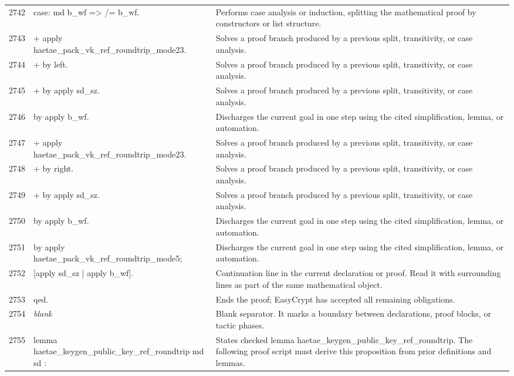\documentclass[10pt]{article}
\begin{document}
\begin{longtable}{r L{0.53\textwidth} L{0.37\textwidth}}
2742 & {\ttfamily\scriptsize case: md b\_wf => /= b\_wf.} & Performs case analysis or induction, splitting the mathematical proof by constructors or list structure. \\
2743 & {\ttfamily\scriptsize + apply haetae\_pack\_vk\_ref\_roundtrip\_mode23.} & Solves a proof branch produced by a previous split, transitivity, or case analysis. \\
2744 & {\ttfamily\scriptsize   + by left.} & Solves a proof branch produced by a previous split, transitivity, or case analysis. \\
2745 & {\ttfamily\scriptsize   + by apply sd\_sz.} & Solves a proof branch produced by a previous split, transitivity, or case analysis. \\
2746 & {\ttfamily\scriptsize   by apply b\_wf.} & Discharges the current goal in one step using the cited simplification, lemma, or automation. \\
2747 & {\ttfamily\scriptsize + apply haetae\_pack\_vk\_ref\_roundtrip\_mode23.} & Solves a proof branch produced by a previous split, transitivity, or case analysis. \\
2748 & {\ttfamily\scriptsize   + by right.} & Solves a proof branch produced by a previous split, transitivity, or case analysis. \\
2749 & {\ttfamily\scriptsize   + by apply sd\_sz.} & Solves a proof branch produced by a previous split, transitivity, or case analysis. \\
2750 & {\ttfamily\scriptsize   by apply b\_wf.} & Discharges the current goal in one step using the cited simplification, lemma, or automation. \\
2751 & {\ttfamily\scriptsize by apply haetae\_pack\_vk\_ref\_roundtrip\_mode5;} & Discharges the current goal in one step using the cited simplification, lemma, or automation. \\
2752 & {\ttfamily\scriptsize    [apply sd\_sz | apply b\_wf].} & Continuation line in the current declaration or proof.  Read it with surrounding lines as part of the same mathematical object. \\
2753 & {\ttfamily\scriptsize qed.} & Ends the proof; EasyCrypt has accepted all remaining obligations. \\
2754 & {\ttfamily\scriptsize \emph{blank}} & Blank separator.  It marks a boundary between declarations, proof blocks, or tactic phases. \\
2755 & {\ttfamily\scriptsize lemma haetae\_keygen\_public\_key\_ref\_roundtrip md sd :} & States checked lemma haetae\_keygen\_public\_key\_ref\_roundtrip.  The following proof script must derive this proposition from prior definitions and lemmas. \\

\end{longtable}
\end{document}
